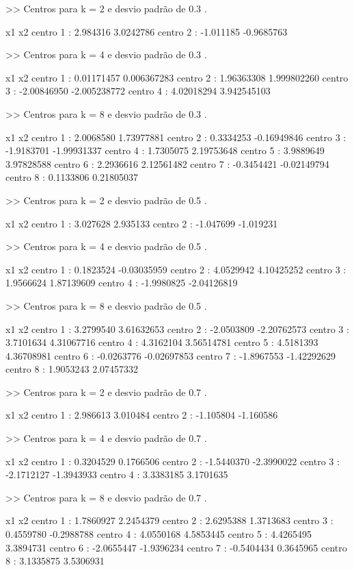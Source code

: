 \documentclass[12pt,a4paper,titlepage]{article}
\begin{document}
\begin{Schunk}
\begin{Soutput}
>> Centros para k =  2 e desvio padrão de  0.3 .

                   x1         x2
centro  1 :  2.984316  3.0242786
centro  2 : -1.011185 -0.9685763

>> Centros para k =  4 e desvio padrão de  0.3 .

                     x1           x2
centro  1 :  0.01171457  0.006367283
centro  2 :  1.96363308  1.999802260
centro  3 : -2.00846950 -2.005238772
centro  4 :  4.02018294  3.942545103

>> Centros para k =  8 e desvio padrão de  0.3 .

                    x1          x2
centro  1 :  2.0068580  1.73977881
centro  2 :  0.3334253 -0.16949846
centro  3 : -1.9183701 -1.99931337
centro  4 :  1.7305075  2.19753648
centro  5 :  3.9889649  3.97828588
centro  6 :  2.2936616  2.12561482
centro  7 : -0.3454421 -0.02149794
centro  8 :  0.1133806  0.21805037

>> Centros para k =  2 e desvio padrão de  0.5 .

                   x1        x2
centro  1 :  3.027628  2.935133
centro  2 : -1.047699 -1.019231

>> Centros para k =  4 e desvio padrão de  0.5 .

                    x1          x2
centro  1 :  0.1823524 -0.03035959
centro  2 :  4.0529942  4.10425252
centro  3 :  1.9566624  1.87139609
centro  4 : -1.9980825 -2.04126819

>> Centros para k =  8 e desvio padrão de  0.5 .

                    x1          x2
centro  1 :  3.2799540  3.61632653
centro  2 : -2.0503809 -2.20762573
centro  3 :  3.7101634  4.31067716
centro  4 :  4.3162104  3.56514781
centro  5 :  4.5181393  4.36708981
centro  6 : -0.0263776 -0.02697853
centro  7 : -1.8967553 -1.42292629
centro  8 :  1.9053243  2.07457332

>> Centros para k =  2 e desvio padrão de  0.7 .

                   x1        x2
centro  1 :  2.986613  3.010484
centro  2 : -1.105804 -1.160586

>> Centros para k =  4 e desvio padrão de  0.7 .

                    x1         x2
centro  1 :  0.3204529  0.1766506
centro  2 : -1.5440370 -2.3990022
centro  3 : -2.1712127 -1.3943933
centro  4 :  3.3383185  3.1701635

>> Centros para k =  8 e desvio padrão de  0.7 .

                    x1         x2
centro  1 :  1.7860927  2.2454379
centro  2 :  2.6295388  1.3713683
centro  3 :  0.4559780 -0.2988788
centro  4 :  4.0550168  4.5853445
centro  5 :  4.4265495  3.3894731
centro  6 : -2.0655447 -1.9396234
centro  7 : -0.5404434  0.3645965
centro  8 :  3.1335875  3.5306931
\end{Soutput}
\end{Schunk}
\end{document}
